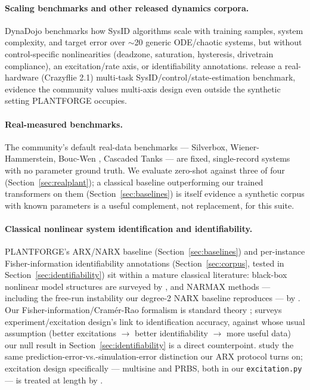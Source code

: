 \documentclass{article}
\begin{document}
\paragraph{Scaling benchmarks and other released dynamics corpora.}
DynaDojo \citep{bhamidipaty2023dynadojo} benchmarks how SysID algorithms
scale with training samples, system complexity, and target error over
$\sim$20 generic ODE/chaotic systems, but without control-specific
nonlinearities (deadzone, saturation, hysteresis, drivetrain compliance), an
excitation/rate axis, or identifiability annotations.
\citet{ullah2026nanobench} release a real-hardware (Crazyflie 2.1) multi-task
SysID/control/state-estimation benchmark, evidence the community values
multi-axis design even outside the synthetic setting PLANTFORGE occupies.

\paragraph{Real-measured benchmarks.}
The community's default real-data benchmarks --- Silverbox, Wiener-Hammerstein,
Bouc-Wen \citep{noel2020boucwen}, Cascaded Tanks \citep{wigren2013three,
schoukens2019nonlinear} --- are fixed, single-record systems with no
parameter ground truth. We evaluate zero-shot against three of four
(Section~\ref{sec:realplant}); a classical baseline outperforming our
trained transformers on them (Section~\ref{sec:baselines}) is itself
evidence a synthetic corpus with known parameters is a useful complement,
not replacement, for this suite.

\paragraph{Classical nonlinear system identification and identifiability.}
PLANTFORGE's ARX/NARX baseline (Section~\ref{sec:baselines}) and per-instance
Fisher-information identifiability annotations (Section~\ref{sec:corpus},
tested in Section~\ref{sec:identifiability}) sit within a mature classical
literature: black-box nonlinear model structures are surveyed by
\citet{sjoberg1995nonlinear}, and NARMAX methods --- including the free-run
instability our degree-2 NARX baseline reproduces --- by
\citet{billings2013nonlinear}. Our Fisher-information/Cram\'er-Rao formalism
is standard theory \citep{ljung1999system}; \citet{hjalmarsson2005experiment}
surveys experiment/excitation design's link to identification accuracy,
against whose usual assumption (better excitations $\to$ better
identifiability $\to$ more useful data) our null result in
Section~\ref{sec:identifiability} is a direct counterpoint.
\citet{aguirre2010prediction} study the same prediction-error-vs.-simulation-error
distinction our ARX protocol turns on; excitation design specifically ---
multisine and PRBS, both in our \texttt{excitation.py} --- is treated at
length by \citet{pintelon2012system}.
\end{document}

